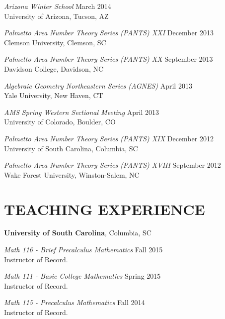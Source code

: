 \documentclass[line,overlapped]{res}
\begin{document}
\begin{resume}
                          {\sl Arizona Winter School} \hfill March 2014\\
                          University of Arizona, Tucson, AZ

                          {\sl Palmetto Area Number Theory Series (PANTS) XXI} \hfill December 2013\\
                          Clemson University, Clemson, SC

                          {\sl Palmetto Area Number Theory Series (PANTS) XX} \hfill September 2013\\
                          Davidson College, Davidson, NC

                          {\sl Algebraic Geometry Northeastern Series (AGNES)} \hfill April 2013\\
                          Yale University, New Haven, CT

                          {\sl AMS Spring Western Sectional Meeting} \hfill April 2013\\
                          University of Colorado, Boulder, CO

                          {\sl Palmetto Area Number Theory Series (PANTS) XIX} \hfill December 2012\\
                          University of South Carolina, Columbia, SC

                          {\sl Palmetto Area Number Theory Series (PANTS) XVIII} \hfill September 2012\\
                          Wake Forest University, Winston-Salem, NC

                          \section{TEACHING EXPERIENCE}
                          {\bf University of South Carolina}, Columbia, SC

                          {\sl Math 116 - Brief Precalculus Mathematics} \hfill Fall 2015\\
                          Instructor of Record.

                          {\sl Math 111 - Basic College Mathematics} \hfill Spring 2015\\
                          Instructor of Record.

                          {\sl Math 115 - Precalculus Mathematics} \hfill Fall 2014\\
                          Instructor of Record.


\end{resume}
\end{document}
